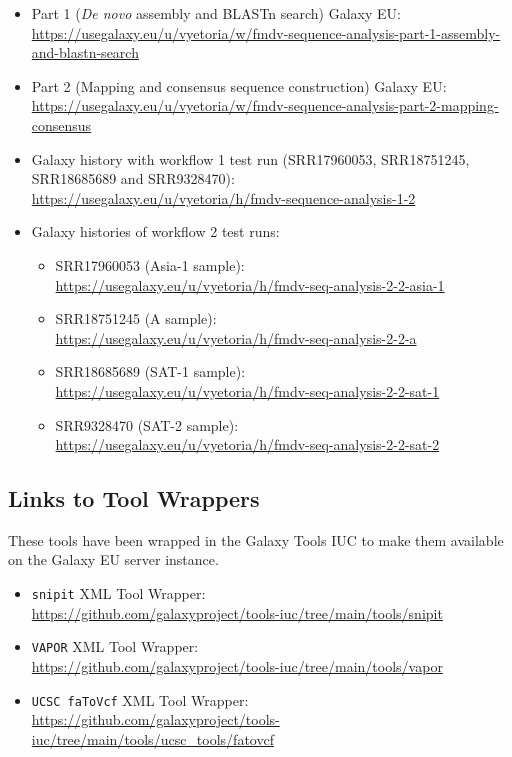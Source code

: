 \begin{itemize}
	\setlength{\itemsep}{-0.4cm}
	\item Part 1 (\textit{De novo} assembly and BLASTn search) Galaxy EU:\\
	\url{https://usegalaxy.eu/u/vyetoria/w/fmdv-sequence-analysis-part-1-assembly-and-blastn-search}
	\item Part 2 (Mapping and consensus sequence construction) Galaxy EU:\\
	\url{https://usegalaxy.eu/u/vyetoria/w/fmdv-sequence-analysis-part-2-mapping-consensus}
	\item Galaxy history with workflow 1 test run (SRR17960053, SRR18751245, SRR18685689 and SRR9328470):\\
	\url{https://usegalaxy.eu/u/vyetoria/h/fmdv-sequence-analysis-1-2}
	\item Galaxy histories of workflow 2 test runs:
	\begin{itemize}
		\setlength{\itemsep}{-0.4cm}
		\vspace*{-0.4cm}
		\item SRR17960053 (Asia-1 sample):\\
		\url{https://usegalaxy.eu/u/vyetoria/h/fmdv-seq-analysis-2-2-asia-1}
		\item SRR18751245 (A sample):\\
		\url{https://usegalaxy.eu/u/vyetoria/h/fmdv-seq-analysis-2-2-a}
		\item SRR18685689 (SAT-1 sample):\\
		\url{https://usegalaxy.eu/u/vyetoria/h/fmdv-seq-analysis-2-2-sat-1}
		\item SRR9328470 (SAT-2 sample):\\
		\url{https://usegalaxy.eu/u/vyetoria/h/fmdv-seq-analysis-2-2-sat-2}
	\end{itemize}
\end{itemize}

\subsection*{\thesubsection \quad Links to Tool Wrappers}
\label{sec:apx-wrap-links}

These tools have been wrapped in the Galaxy Tools IUC to make them available on the Galaxy EU server instance.

\begin{itemize}
	\setlength{\itemsep}{-0.4cm}
	\item \texttt{snipit} XML Tool Wrapper:\\
	\url{https://github.com/galaxyproject/tools-iuc/tree/main/tools/snipit}
	\item \texttt{VAPOR} XML Tool Wrapper:\\
	\url{https://github.com/galaxyproject/tools-iuc/tree/main/tools/vapor}
	\item \texttt{UCSC faToVcf} XML Tool Wrapper:\\
	\url{https://github.com/galaxyproject/tools-iuc/tree/main/tools/ucsc_tools/fatovcf}
\end{itemize}

